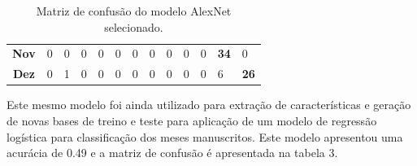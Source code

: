 \documentclass[
	12pt,				%
	openright,			%
	twoside,			%
	a4paper,			%
	english,			%
	brazil,				%
	svgnames
	]{abntex2}\usepackage[]{graphicx}\usepackage[]{color}
\begin{document}
\begin{table}[h]
\begin{tabular}{c|llllllllllll}
\textbf{Nov} & 0                                & 0                                & 0                                & 0                                & 0                                & 0                                & 0                                & 0                                & 0                                & \multicolumn{1}{l|}{0}           & \multicolumn{1}{l|}{\textbf{34}} & 0                                \\ \cline{12-13} 
\textbf{Dez} & 0                                & 1                                & 0                                & 0                                & 0                                & 0                                & 0                                & 0                                & 0                                & 0                                & \multicolumn{1}{l|}{6}           & \multicolumn{1}{l|}{\textbf{26}} \\ \hline
\end{tabular}
\caption{Matriz de confusão do modelo AlexNet selecionado.}
\label{tab:my-table}
\end{table}

Este mesmo modelo foi ainda utilizado para extração de características e geração de novas bases de treino e teste para aplicação de um modelo de regressão logística para classificação dos meses manuscritos. Este modelo apresentou uma acurácia de 0.49 e a matriz de confusão é apresentada na tabela 3.
\end{document}
